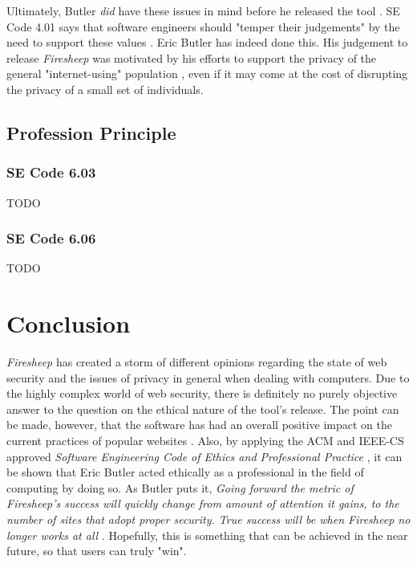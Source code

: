 \documentclass[11pt]{article}
\begin{document}
\begin{multicols}{2}
Ultimately, Butler \emph{did} have these issues in mind before he released the tool \cite{codebutler_main}. SE Code 4.01 says that software engineers should "temper their judgements" by the need to support these values \cite{se_code}. Eric Butler has indeed done this. His judgement to release \emph{Firesheep} was motivated by his efforts to support the privacy of the general "internet-using" population \cite{codebutler_main}, even if it may come at the cost of disrupting the privacy of a small set of individuals.
\subsection{Profession Principle}
\subsubsection{SE Code 6.03}
TODO
\subsubsection{SE Code 6.06}
TODO

\section{Conclusion}
\emph{Firesheep} has created a storm of different opinions regarding the state of web security and the issues of privacy in general when dealing with computers. Due to the highly complex world of web security, there is definitely no purely objective answer to the question on the ethical nature of the tool's release. The point can be made, however, that the software has had an overall positive impact on the current practices of popular websites \cite{github_reaction} \cite{facebook_reaction} \cite{twitter_reaction}. Also, by applying the ACM and IEEE-CS approved \emph{Software Engineering Code of Ethics and Professional Practice} \cite{se_code}, it can be shown that Eric Butler acted ethically as a professional in the field of computing by doing so. As Butler puts it, \emph{Going forward the metric of Firesheep’s success will quickly change from amount of attention it gains, to the number of sites that adopt proper security. True success will be when Firesheep no longer works at all} \cite{codebutler_blog_2}. Hopefully, this is something that can be achieved in the near future, so that users can truly "win".

\end{multicols}
\newpage
\nocite{*}


\end{document}
